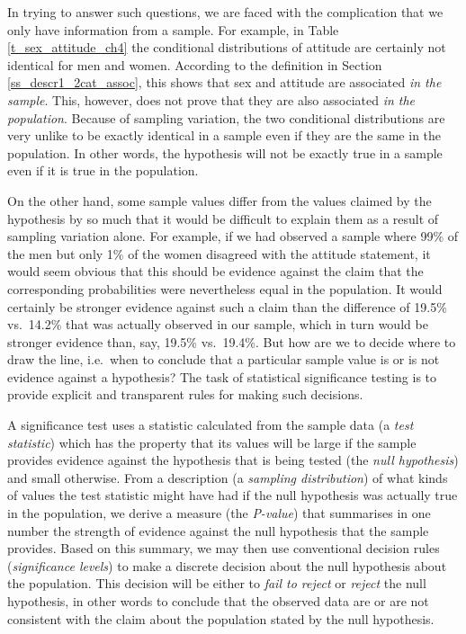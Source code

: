 In trying to answer such questions, we are faced with the
complication that we only have information from a sample. For
example, in Table \ref{t_sex_attitude_ch4} the conditional distributions
of attitude are certainly not identical for men and women. According to
the definition in Section \ref{ss_descr1_2cat_assoc}, this shows that
sex and attitude are associated \emph{in the sample}. This, however,
does not prove that they are also associated \emph{in the population}.
Because of sampling variation, the two conditional distributions are
very unlike to be exactly identical in a sample even if they are the
same in the population. In other words, the hypothesis will not be
exactly true in a sample even if it is true in the population.

On the other hand, some sample values differ from the values claimed by
the hypothesis by so much that it would be difficult to explain them as
a result of sampling variation alone. For example, if we had observed a
sample where 99\% of the men but only 1\% of the women disagreed with
the attitude statement, it would seem obvious that this
should be evidence against the claim that the corresponding probabilities
were nevertheless equal in the population. It would certainly be
stronger evidence against such a claim than the difference of 19.5\%
vs.\ 14.2\% that was actually observed in our sample, which in turn
would be stronger evidence than, say, 19.5\% vs.\ 19.4\%. But
how are we to decide where to draw the line, i.e.\ when to conclude that
a particular sample value is or is not evidence against a hypothesis?
The task of statistical significance testing is to provide explicit and
transparent rules for making such decisions.

\label{p_test_intuition}
A significance test uses a statistic calculated from the sample data (a
\emph{test statistic}) which has the property that its
values will be large if the sample provides evidence against the
hypothesis that is being tested (the \emph{null hypothesis}) and small
otherwise. From a description (a \emph{sampling distribution}) of what
kinds of values the test statistic might have had if the null hypothesis
was actually true in the population, we derive a measure (the
\emph{P-value}) that summarises in one number the strength of evidence
against the null hypothesis that the sample provides. Based on this
summary, we may then use conventional decision rules (\emph{significance
levels}) to make a discrete decision about the null hypothesis about the
population. This decision will be either to \emph{fail to reject} or
\emph{reject} the null hypothesis, in other words to conclude that the observed data are
or are not consistent with the claim about the population stated by the
null hypothesis.

